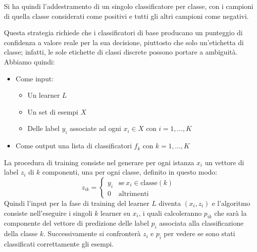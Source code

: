 Si ha quindi l'addestramento di un singolo classificatore per classe, con i campioni
di quella classe considerati come positivi e tutti gli altri campioni come negativi.

Questa strategia richiede che i classificatori di base producano un punteggio di
confidenza a valore reale per la sua decisione, piuttosto che solo un'etichetta
di classe; infatti, le sole etichette di classi discrete possono portare a ambiguità.
Abbiamo quindi:
\begin{itemize}
    \item Come input:
          \begin{itemize}
              \item Un learner $L$
              \item Un set di esempi $X$
              \item Delle label $y_i$ associate ad ogni $x_i \in X$ con $i = 1, \dots, K$
          \end{itemize}
    \item Come output una lista di classificatori $f_k$ con $k = 1,\dots, K$
\end{itemize}
La procedura di training consiste nel generare per ogni istanza $x_i$ un vettore
di label $z_i$ di $k$ componenti, una per ogni classe, definito in questo modo:
\begin{equation}
    z_{ik} = \begin{cases}
        y_i & \text{se} \ x_i \in \text{classe}(k) \\
        0   & \text{altrimenti}
    \end{cases}
\end{equation}
Quindi l'input per la fase di training del learner $L$ diventa $(x_i,z_i)$ e l'algoritmo
consiste nell'eseguire i singoli $k$ learner su $x_i$, i quali calcoleranno
$p_{ik}$ che sarà la componente del vettore di predizione delle label $p_i$ associata
alla classificazione della classe $k$. Successivamente si confronterà $z_i$ e $p_i$
per vedere se sono stati classificati correttamente gli esempi.

